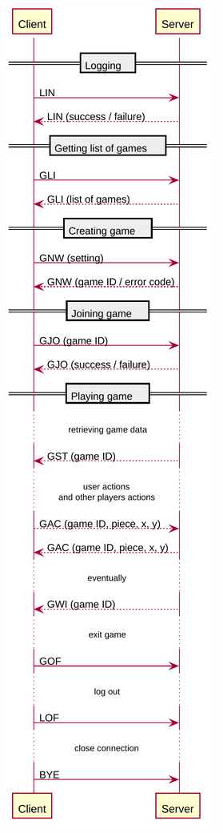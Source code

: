 \documentclass[12pt, a4paper]{report}
\begin{document}
\begin{figure}[H]
	\centering
	\begin{minipage}[b]{0.4\textwidth}
		\includegraphics[width=0.85\linewidth]{sequence-diagram.pdf}

\end{minipage}
\end{figure}
\end{document}
